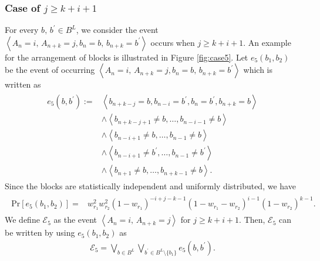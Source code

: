\documentclass[dvipdfmx,english]{ampmt} %
\begin{document}
\subsubsection{Case of $j \geq k+i+1$}
For every $b,\, b^\prime \in B^L$, we consider the event $\left< A_n=i ,\, A_{n+k}=j,b_n=b,\,b_{n+k}=b^\prime\right>$ occurs when $j \geq k+i+1$. An example for the arrangement of blocks is illustrated in Figure \ref{fig:case5}. Let $e_5(b_1,b_2)$ be the event of occurring $\left< A_n=i ,\, A_{n+k}=j,b_n=b,\,b_{n+k}=b^\prime\right>$ which is written as
\begin{align}
\begin{split}
  \label{eq:e_5}
  e_5 (b,b^\prime) := 
  &\left< b_{n+k-j} = b , b_{n-i} = b^\prime , b_{n} = b^\prime , b_{n+k} = b \right> \\
  &\land \left< b_{n+k-j+1} \neq b, \dots, b_{n-i-1} \neq b \right> \\
  &\land \left< b_{n-i+1} \neq b, \dots, b_{n-1} \neq b \right> \\
  &\land \left< b_{n-i+1} \neq b^\prime, \dots, b_{n-1} \neq b^\prime \right> \\
  &\land \left< b_{n+1} \neq b , \dots, b_{n+k-1} \neq b \right>.
\end{split}
\end{align}
Since the blocks are statistically independent and uniformly distributed, we have
\begin{align}
\begin{split}
  \label{eq:probability_e5}
  \mathrm{Pr} \left[ e_5(b_1,b_2) \right] 
  =& w_{r_1}^2  w_{r_2}^2 
  (1-w_{r_1})^{-i+j-k-1} 
  (1-w_{r_1}-w_{r_2})^{i-1}
  (1-w_{r_2})^{k-1}. 
\end{split}
\end{align}
We define $\mathcal{E}_5$ as the event $\left< A_n=i ,\, A_{n+k}=j\right>$ for $j \geq k+i+1$. Then, $\mathcal{E}_5$ can be written by using $e_5(b_1,b_2)$ as
\begin{align}\label{eq:E_5}
  \mathcal{E}_5 = \bigvee_{b \in B^L} \bigvee_{b^\prime \in B^L \setminus \{b_1\}} e_5(b,b^\prime).
\end{align}
\end{document}
